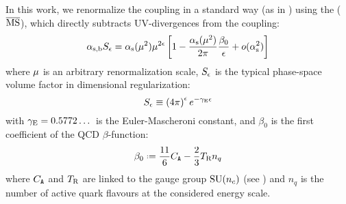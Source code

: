 In this work, we renormalize the coupling in a standard way (as in \cite{Catani-1998}) using the  ($ \overline{\text{MS}} $), which directly subtracts UV-divergences from the coupling:
\begin{equation}
  \alpha_\text{s,b} S_\epsilon = \alpha_\text{s}(\mu^2) \mu^{2\epsilon} \left[ 1 - \frac{\alpha_\text{s}(\mu^2)}{2\pi} \frac{\beta_0}{\epsilon} + o(\alpha_\text{s}^2) \right]
  \label{eq:msb-def}
\end{equation}
where $ \mu $ is an arbitrary renormalization scale, $ S_\epsilon $ is the typical phase-space volume factor in dimensional regularization:
\begin{equation}
  S_\epsilon \equiv \left( 4\pi \right)^\epsilon e^{-\gamma_\text{E} \epsilon}
\end{equation}
with $ \gamma_\text{E} = 0.5772\dots $ is the Euler-Mascheroni constant, and $ \beta_0 $ is the first coefficient of the QCD $ \beta $-function:
\begin{equation}
  \beta_0 \defeq \frac{11}{6} \caa - \frac{2}{3} \ttr n_q
\end{equation}
where $ C_\mathtt{A} $ and $ T_\text{R} $ are linked to the gauge group $ \mathrm{SU}(n_c) $ (see )  and $ n_q $ is the number of active quark flavours at the considered energy scale\footnotemark.


